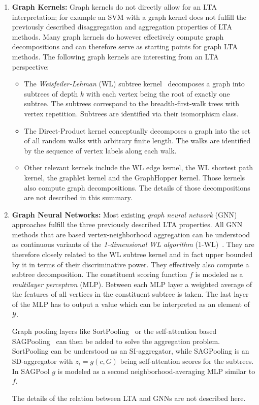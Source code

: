 \documentclass[12pt]{scrartcl}
\begin{document}
\begin{enumerate}[label=\textbf{\arabic*.}]
	\item \textbf{Graph Kernels:}
		Graph kernels do not directly allow for an LTA interpretation;
		for example an SVM with a graph kernel does not fulfill the previously described disaggregation and aggregation properties of LTA methods.
		Many graph kernels do however effectively compute graph decompositions and can therefore serve as starting points for graph LTA methods.
		The following graph kernels are interesting from an LTA perspective:
		\begin{itemize}
			\item The \textit{Weisfeiler-Lehman} (WL) subtree kernel~\cite{Shervashidze2011} decomposes a graph into subtrees of depth $k$ with each vertex being the root of exactly one subtree.
				The subtrees correspond to the breadth-first-walk trees with vertex repetition.
				Subtrees are identified via their isomorphism class.
			\item The Direct-Product kernel conceptually decomposes a graph into the set of all random walks with arbitrary finite length.
				The walks are identified by the sequence of vertex labels along each walk.
			\item Other relevant kernels include the WL edge kernel, the WL shortest path kernel, the graphlet kernel and the GraphHopper kernel.
				Those kernels also compute graph decompositions.
				The details of those decompositions are not described in this summary.
		\end{itemize}
	\item \textbf{Graph Neural Networks:}
		Most existing \textit{graph neural network} (GNN) approaches fulfill the three previously described LTA properties.
		All GNN methods that are based vertex-neighborhood aggregation can be understood as continuous variants of the \textit{1-dimensional WL algorithm} (1-WL)~\cite{Weisfeiler1968}.
		They are therefore closely related to the WL subtree kernel and in fact upper bounded by it in terms of their discriminative power.
		They effectively also compute a subtree decomposition.
		The constituent scoring function $f$ is modeled as a \textit{multilayer perceptron} (MLP).\@
		Between each MLP layer a weighted average of the features of all vertices in the constituent subtree is taken.
		The last layer of the MLP has to output a value which can be interpreted as an element of $\mathcal{Y}$.

		Graph pooling layers like SortPooling~\cite{Zhang2018} or the self-attention based SAGPooling~\cite{Lee2019} can then be added to solve the aggregation problem.
		SortPooling can be understood as an SI-aggregator, while SAGPooling is an SD-aggregator with $z_i = g(c, G)$ being self-attention scores for the subtrees.
		In SAGPool $g$ is modeled as a second neighborhood-averaging MLP similar to $f$.

		The details of the relation between LTA and GNNs are not described here.
\end{enumerate}
\end{document}
